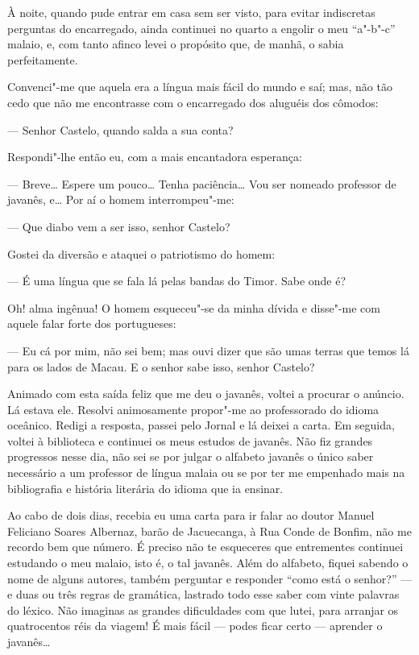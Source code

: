 À noite, quando pude entrar em casa sem ser visto, para evitar
indiscretas perguntas do encarregado, ainda continuei no quarto a
engolir o meu ``a"-b"-c'' malaio, e, com tanto afinco levei o propósito
que, de manhã, o sabia perfeitamente.

Convenci"-me que aquela era a língua mais fácil do mundo e saí; mas, não
tão cedo que não me encontrasse com o encarregado dos aluguéis dos
cômodos:

--- Senhor Castelo, quando salda a sua conta?

Respondi"-lhe então eu, com a mais encantadora esperança:

--- Breve\ldots{} Espere um pouco\ldots{} Tenha paciência\ldots{} Vou ser nomeado
professor de javanês, e\ldots{} Por aí o homem interrompeu"-me:

--- Que diabo vem a ser isso, senhor Castelo?

Gostei da diversão e ataquei o patriotismo do homem:

--- É uma língua que se fala lá pelas bandas do Timor. Sabe onde é?

Oh! alma ingênua! O homem esqueceu"-se da minha dívida e disse"-me com
aquele falar forte dos portugueses:

--- Eu cá por mim, não sei bem; mas ouvi dizer que são umas terras que
temos lá para os lados de Macau. E o senhor sabe isso, senhor Castelo?

Animado com esta saída feliz que me deu o javanês, voltei a procurar o
anúncio. Lá estava ele. Resolvi animosamente propor"-me ao professorado
do idioma oceânico. Redigi a resposta, passei pelo Jornal e lá deixei a
carta. Em seguida, voltei à biblioteca e continuei os meus estudos de
javanês. Não fiz grandes progressos nesse dia, não sei se por julgar o
alfabeto javanês o único saber necessário a um professor de língua
malaia ou se por ter me empenhado mais na bibliografia e história
literária do idioma que ia ensinar.

Ao cabo de dois dias, recebia eu uma carta para ir falar ao doutor
Manuel Feliciano Soares Albernaz, barão de Jacuecanga, à Rua Conde de
Bonfim, não me recordo bem que número. É preciso não te esqueceres que
entrementes continuei estudando o meu malaio, isto é, o tal javanês.
Além do alfabeto, fiquei sabendo o nome de alguns autores, também
perguntar e responder ``como está o senhor?'' --- e duas ou três regras
de gramática, lastrado todo esse saber com vinte palavras do léxico. Não
imaginas as grandes dificuldades com que lutei, para arranjar os
quatrocentos réis da viagem! É mais fácil --- podes ficar certo ---
aprender o javanês\ldots{}

